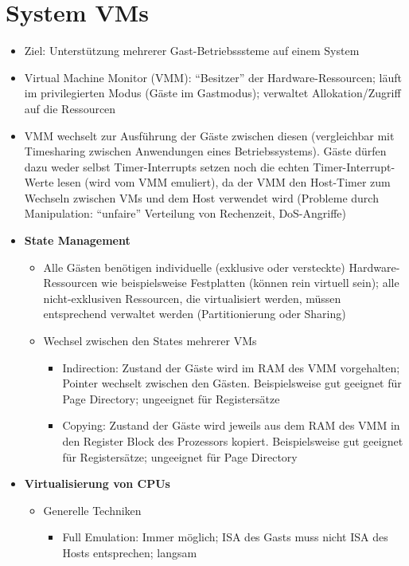\section{System VMs}
\begin{itemize}
	\item Ziel: Unterstützung mehrerer Gast-Betriebsssteme auf einem System
	\item Virtual Machine Monitor (VMM): "`Besitzer"' der Hardware-Ressourcen; läuft im privilegierten Modus (Gäste im Gastmodus); verwaltet Allokation/Zugriff auf die Ressourcen
	\item VMM wechselt zur Ausführung der Gäste zwischen diesen (vergleichbar mit Timesharing zwischen Anwendungen eines Betriebssystems). Gäste dürfen dazu weder selbst Timer-Interrupts setzen noch die echten Timer-Interrupt-Werte lesen (wird vom VMM emuliert), da der VMM den Host-Timer zum Wechseln zwischen VMs und dem Host verwendet wird (Probleme durch Manipulation: "`unfaire"' Verteilung von Rechenzeit, DoS-Angriffe)
	\item \textbf{State Management}
	\begin{itemize}
		\item Alle Gästen benötigen individuelle (exklusive oder versteckte) Hardware-Ressourcen wie beispielsweise Festplatten (können rein virtuell sein); alle nicht-exklusiven Ressourcen, die virtualisiert werden, müssen entsprechend verwaltet werden (Partitionierung oder Sharing)
		\item Wechsel zwischen den States mehrerer VMs
		\begin{itemize}
			\item Indirection: Zustand der Gäste wird im RAM des VMM vorgehalten; Pointer wechselt zwischen den Gästen. Beispielsweise gut geeignet für Page Directory; ungeeignet für Registersätze
			\item Copying: Zustand der Gäste wird jeweils aus dem RAM des VMM in den Register Block des Prozessors kopiert. Beispielsweise gut geeignet für Registersätze; ungeeignet für Page Directory
		\end{itemize}
	\end{itemize}
	\item \textbf{Virtualisierung von CPUs}
	\begin{itemize}
		\item Generelle Techniken
		\begin{itemize}
			\item Full Emulation: Immer möglich; ISA des Gasts muss nicht ISA des Hosts entsprechen; langsam

\end{itemize}
\end{itemize}
\end{itemize}
